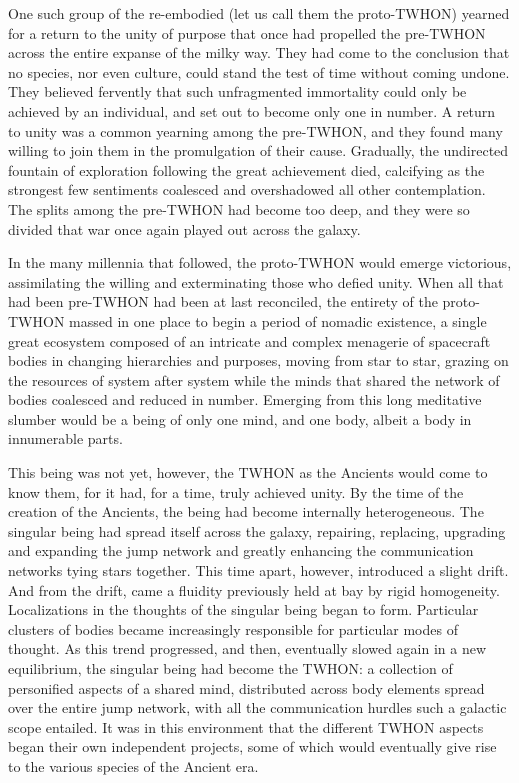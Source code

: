 One such group of the re-embodied (let us call them the proto-TWHON) 
yearned for a return to the unity of purpose that once had propelled 
the pre-TWHON across the entire expanse of the milky way. They had 
come to the conclusion that no species, nor even culture, could stand 
the test of time without coming undone. They believed fervently that 
such unfragmented immortality could only be achieved by an individual, 
and set out to become only one in number. A return to unity was a 
common yearning among the pre-TWHON, and they found many willing to 
join them in the promulgation of their cause. Gradually, the 
undirected fountain of exploration following the great achievement 
died, calcifying as the strongest few sentiments coalesced and 
overshadowed all other contemplation. The splits among the pre-TWHON 
had become too deep, and they were so divided that war once again 
played out across the galaxy. 

In the many millennia that followed, the proto-TWHON would emerge 
victorious, assimilating the willing and exterminating those who 
defied unity. When all that had been pre-TWHON had been at last 
reconciled, the entirety of the proto-TWHON massed in one place to 
begin a period of nomadic existence, a single great ecosystem composed 
of an intricate and complex menagerie of spacecraft bodies in changing 
hierarchies and purposes, moving from star to star, grazing on the 
resources of system after system while the minds that shared the 
network of bodies coalesced and reduced in number. Emerging from this 
long meditative slumber would be a being of only one mind, and one 
body, albeit a body in innumerable parts. 

This being was not yet, however, the TWHON as the Ancients would come
to know them, for it had, for a time, truly achieved unity. By the
time of the creation of the Ancients, the being had become internally
heterogeneous. The singular being had spread itself across the galaxy,
repairing, replacing, upgrading and expanding the jump network and
greatly enhancing the communication networks tying stars
together. This time apart, however, introduced a slight drift. And
from the drift, came a fluidity previously held at bay by rigid
homogeneity. Localizations in the thoughts of the singular being began
to form. Particular clusters of bodies became increasingly responsible
for particular modes of thought. As this trend progressed, and then,
eventually slowed again in a new equilibrium, the singular being had
become the TWHON: a collection of personified aspects of a shared
mind, distributed across body elements spread over the entire jump
network, with all the communication hurdles such a galactic scope
entailed. It was in this environment that the different TWHON aspects
began their own independent projects, some of which would eventually
give rise to the various species of the Ancient era.

